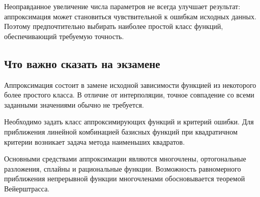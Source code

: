 Неоправданное увеличение числа параметров не всегда улучшает результат: аппроксимация может становиться чувствительной к ошибкам исходных данных. Поэтому предпочтительно выбирать наиболее простой класс функций, обеспечивающий требуемую точность.

\subsection{Что важно сказать на экзамене}

Аппроксимация состоит в замене исходной зависимости функцией из некоторого более простого класса. В отличие от интерполяции, точное совпадение со всеми заданными значениями обычно не требуется.

Необходимо задать класс аппроксимирующих функций и критерий ошибки. Для приближения линейной комбинацией базисных функций при квадратичном критерии возникает задача метода наименьших квадратов.

Основными средствами аппроксимации являются многочлены, ортогональные разложения, сплайны и рациональные функции. Возможность равномерного приближения непрерывной функции многочленами обосновывается теоремой Вейерштрасса.

\newpage